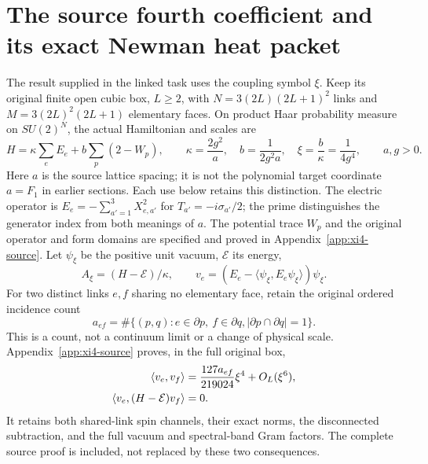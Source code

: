\section{The source fourth coefficient and its exact Newman heat packet}
\label{sec:xi4-packet}

The result supplied in the linked task uses the coupling symbol $\xi$.
Keep its original finite open cubic box, $L\ge2$, with
$N=3(2L)(2L+1)^2$ links and $M=3(2L)^2(2L+1)$ elementary faces.
On product Haar probability measure on $SU(2)^N$, the actual Hamiltonian
and scales are
\[
H=\kappa\sum_e E_e+b\sum_p(2-W_p),\qquad
\kappa=\frac{2g^2}{a},\quad b=\frac1{2g^2a},\quad
\xi=\frac b\kappa=\frac1{4g^4},\qquad a,g>0.
\]
Here $a$ is the source lattice spacing; it is not the polynomial target
coordinate $a=F_1$ in earlier sections. Each use below retains this
distinction. The electric operator is
$E_e=-\sum_{a'=1}^3X_{e,a'}^2$ for $T_{a'}=-i\sigma_{a'}/2$;
the prime distinguishes the generator index from both meanings of $a$.
The potential trace $W_p$ and the original operator and form domains
are specified and proved in Appendix~\ref{app:xi4-source}.
Let $\psi_\xi$ be the positive unit vacuum, $\mathcal E$ its energy,
\[
A_\xi=(H-\mathcal E)/\kappa,\qquad
v_e=(E_e-\langle\psi_\xi,E_e\psi_\xi\rangle)\psi_\xi.
\]
For two distinct links $e,f$ sharing no elementary face, retain the
original ordered incidence count
\[
a_{ef}=\#\{(p,q):e\in\partial p,\ f\in\partial q,
                    |\partial p\cap\partial q|=1\}.
\]
This is a count, not a continuum limit or a change of physical scale.
Appendix~\ref{app:xi4-source} proves, in the full original box,
\begin{align}
\langle v_e,v_f\rangle
 &=\frac{127a_{ef}}{219024}\xi^4+O_L(\xi^6),\notag\\
\langle v_e,(H-\mathcal E)v_f\rangle&=0.
\label{x4:source-moments}
\end{align}
It retains both shared-link spin channels, their exact norms, the
disconnected subtraction, and the full vacuum and spectral-band Gram
factors. The complete source proof is included, not replaced by these
two consequences.


